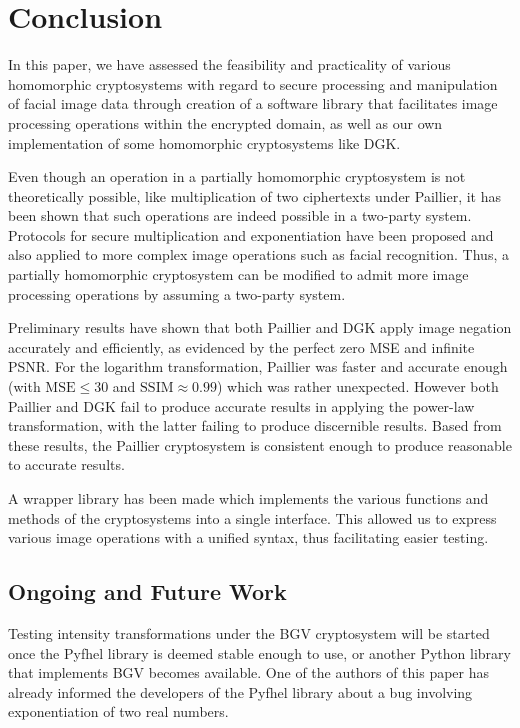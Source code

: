 \section{Conclusion}
In this paper, we have assessed the feasibility and practicality of various homomorphic cryptosystems with regard to secure processing and manipulation of facial image data through creation of a software library that facilitates image processing operations within the encrypted domain, as well as our own implementation of some homomorphic cryptosystems like DGK.


Even though an operation in a partially homomorphic cryptosystem is not theoretically possible, like multiplication of two ciphertexts under Paillier, it has been shown that such operations are indeed possible in a two-party system. Protocols for secure multiplication and exponentiation have been proposed and also applied to more complex image operations such as facial recognition. Thus, a partially homomorphic cryptosystem can be modified to admit more image processing operations by assuming a two-party system.

Preliminary results have shown that both Paillier and DGK apply image negation accurately and efficiently, as evidenced by the perfect zero MSE and infinite PSNR. For the logarithm transformation, Paillier was faster and accurate enough (with $\text{MSE} \le 30$ and $\text{SSIM} \approx 0.99$) which was rather unexpected. However both Paillier and DGK fail to produce accurate results in applying the power-law transformation, with the latter failing to produce discernible results. Based from these results, the Paillier cryptosystem is consistent enough to produce reasonable to accurate results.

A wrapper library has been made which implements the various functions and methods of the cryptosystems into a single interface. This allowed us to express various image operations with a unified syntax, thus facilitating easier testing.

\subsection{Ongoing and Future Work}
Testing intensity transformations under the BGV cryptosystem will be started once the Pyfhel library is deemed stable enough to use, or another Python library that implements BGV becomes available.
One of the authors of this paper has already informed the developers of the Pyfhel library about a bug involving exponentiation of two real numbers.

